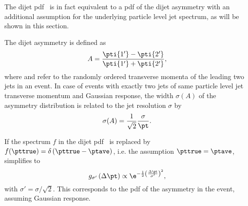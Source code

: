 The dijet pdf~ is in fact equivalent to a pdf of the dijet
asymmetry with an additional assumption for the underlying particle
level jet spectrum, as will be shown in this section.

The dijet asymmetry is defined as
\begin{equation}\label{eq:ResFit:Asymmetry}
  A = \frac{\pti{1'}-\pti{2'}}{\pti{1'}+\pti{2'}},
\end{equation}
where  and  refer to the randomly ordered transverse momenta of the
leading two jets in an event.
In case of events with exactly two jets of same particle level jet
transverse momentum \pt and Gaussian response, the width $\sigma(A)$ of the asymmetry distribution is
related to the jet \pt resolution $\sigma$ by
\begin{equation}
  \label{eq:ResFit:ResFromAsym}
  \sigma(A) = \frac{1}{\sqrt{2}}\frac{\sigma}{\pt}.
\end{equation}

If the spectrum $f$ in the dijet pdf~ is replaced by \mbox{$f(\pttrue)  = \delta\left(\pttrue - \ptave\right)$}, i.e. the assumption \mbox{$\pttrue = \ptave$}, 
 simplifies to
\begin{equation}
\label{eq:ResFit::DijetPdfTransformed:Simple}
  g_{\sigma'}\left(\Delta\pt\right) \propto
  \e^{-\frac{1}{2}\left(\frac{\Delta\pt}{\sigma'}\right)^{2}}, 
\end{equation}
with \mbox{$\sigma' = \sigma/\sqrt{2}$}.
This corresponds to the pdf of the asymmetry in the event, assuming
Gaussian response.
